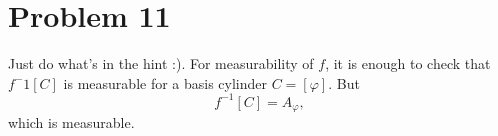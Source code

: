 \section*{Problem 11}

Just do what's in the hint :). For measurability of \( f \), it is enough to check that \( f^-1[C] \) is measurable for a basis cylinder \( C = \left[ \varphi \right] \). But
\[ 
    f^{-1} [ C ] = A_\varphi,
\]
which is measurable.
